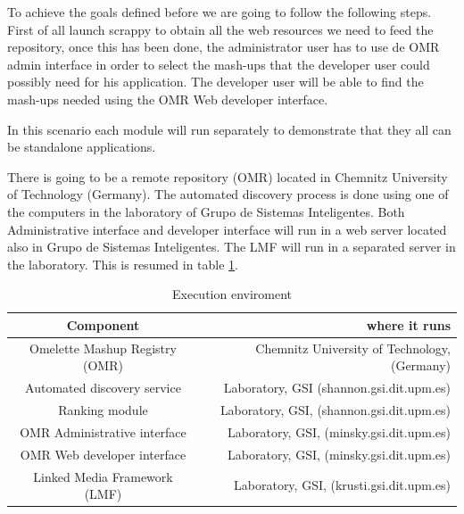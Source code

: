To achieve the goals defined before we are going to follow the following steps. First of all launch scrappy to obtain all the web resources we need to feed the repository, once this has been done, the administrator user has to use de OMR admin interface in order to select the mash-ups that the developer user could possibly need for his application. The developer user will be able to find the mash-ups needed using the OMR Web developer interface.

In this scenario each module will run separately to demonstrate that they all can be standalone applications.

There is going to be a remote repository (OMR) located in Chemnitz University of Technology (Germany). The automated discovery process is done using one of the computers in the laboratory of Grupo de Sistemas Inteligentes. Both Administrative interface and developer interface will run in a web server located also in Grupo de Sistemas Inteligentes. The LMF will run in a separated server in the laboratory. This is resumed in table \ref{tab:executionenviroment}.


\begin {table}[h]
\caption {Execution enviroment} \label{tab:executionenviroment} 
\begin{center}
	\begin{tabular}{|c|r|}
		\hline \textbf{Component}                  	   & \textbf{where it runs}          \\ 
		\hline Omelette Mashup Registry (OMR)                  	   &   Chemnitz University of Technology, (Germany)       \\ 
		\hline Automated discovery service                 	   &   Laboratory, GSI (shannon.gsi.dit.upm.es)        \\
		\hline Ranking module 									&   Laboratory, GSI, (shannon.gsi.dit.upm.es)        \\ 
		\hline OMR Administrative interface                 	   &   Laboratory, GSI, (minsky.gsi.dit.upm.es)        \\ 
		\hline OMR Web developer interface                  	   &   Laboratory, GSI, (minsky.gsi.dit.upm.es)        \\
		\hline Linked Media Framework (LMF)                  	   &   Laboratory, GSI, (krusti.gsi.dit.upm.es)        \\ 
		\hline 
	\end{tabular} 
\end{center}
\end{table}

